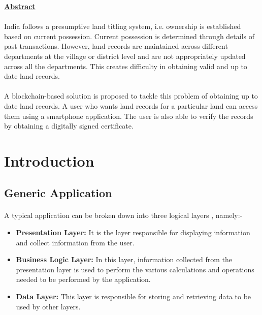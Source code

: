 \documentclass[12pt]{article}
\begin{document}
\clearpage


{
    \begin{center}
        \textbf{\underline{\large{Abstract}}}
    \end{center}

    \paragraph{}
    India follows a presumptive land titling system, i.e. ownership is established based on current possession. Current possession is determined through details of past transactions. However, land records are maintained across different departments at the village or district level and are not appropriately updated across all the departments. This creates difficulty in obtaining valid and up to date land records.
    
    \paragraph{}
    A blockchain-based solution is proposed to tackle this problem of obtaining up to date land records. A user who wants land records for a particular land can access them using a smartphone application. The user is also able to verify the records by obtaining a digitally signed certificate.

    \thispagestyle{empty}
}

\clearpage

\tableofcontents
\clearpage
{}
\listoffigures
\printglossaries
{}

\section{Introduction}
    \subsection{Generic Application}
        \paragraph{} A typical application can be broken down into three logical layers \cite{wikimulti}, namely:-
        \begin{itemize}
            \item \textbf{Presentation Layer: }It is the layer responsible for displaying information and collect information from the user.
            \item \textbf{Business Logic Layer: }In this layer, information collected from the presentation layer is used to perform the various calculations and operations needed to be performed by the application.
            \item \textbf{Data Layer: }This layer is responsible for storing and retrieving data to be used by other layers.
        \end{itemize}
\end{document}
